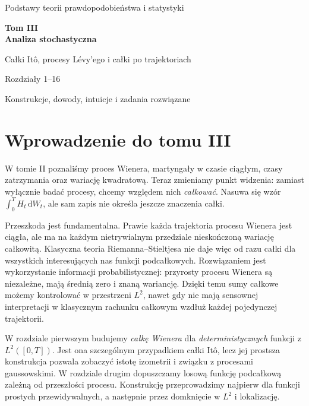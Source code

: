 \documentclass[11pt,a4paper,oneside]{report}
\numberwithin{equation}{chapter}
\theoremstyle{plain}
\theoremstyle{definition}
\theoremstyle{remark}
\newcommand{\dd}{\mathrm{d}}
\begin{document}
\hypersetup{pageanchor=false}
\begin{titlepage}
\centering\vspace*{3.4cm}
{\Large Podstawy teorii prawdopodobieństwa i statystyki\par}
\vspace{1.2cm}
{\Huge\bfseries Tom III\\[0.25cm] Analiza stochastyczna\par}
\vspace{0.9cm}
{\LARGE Całki Itô, procesy Lévy'ego i całki po trajektoriach\par}
\vspace{0.7cm}
{\Large Rozdziały 1--16\par}
\vfill
{\large Konstrukcje, dowody, intuicje i zadania rozwiązane\par}
\vspace{1.1cm}
\end{titlepage}
\hypersetup{pageanchor=true}
\tableofcontents
\chapter*{Wprowadzenie do tomu III}
W tomie II poznaliśmy proces Wienera, martyngały w czasie ciągłym,
czasy zatrzymania oraz wariację kwadratową. Teraz zmieniamy punkt
widzenia: zamiast wyłącznie badać procesy, chcemy względem nich
\emph{całkować}. Nasuwa się wzór $\int_0^T H_t\,\dd W_t$, ale
sam zapis nie określa jeszcze znaczenia całki.

Przeszkoda jest fundamentalna. Prawie każda trajektoria procesu Wienera
jest ciągła, ale ma na każdym nietrywialnym przedziale nieskończoną
wariację całkowitą. Klasyczna teoria Riemanna--Stieltjesa nie daje więc
od razu całki dla wszystkich interesujących nas funkcji podcałkowych.
Rozwiązaniem jest wykorzystanie informacji probabilistycznej:
przyrosty procesu Wienera są niezależne, mają średnią zero i znaną
wariancję. Dzięki temu sumy całkowe możemy kontrolować w przestrzeni
$L^2$, nawet gdy nie mają sensownej interpretacji w klasycznym
rachunku całkowym wzdłuż każdej pojedynczej trajektorii.

W rozdziale pierwszym budujemy \emph{całkę Wienera} dla
\emph{deterministycznych} funkcji z $L^2([0,T])$. Jest ona szczególnym
przypadkiem całki Itô, lecz jej prostsza konstrukcja pozwala zobaczyć
istotę izometrii i związku z procesami gaussowskimi. W rozdziale
drugim dopuszczamy losową funkcję podcałkową zależną od przeszłości
procesu. Konstrukcję przeprowadzimy najpierw dla funkcji prostych
przewidywalnych, a następnie przez domknięcie w $L^2$ i lokalizację.
\end{document}
